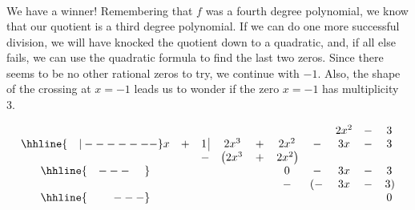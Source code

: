 {\begin{enumerate}
{\[\begin{array}{ccccccccccccc}
 \end{array}\]
 
\setlength\arraycolsep{5pt}
\setlength\extrarowheight{0pt}

}
We have a winner!  Remembering that $f$ was a fourth degree polynomial, we know that our quotient is a third degree polynomial.  If we can do one more successful division, we will have knocked the quotient down to a quadratic, and, if all else fails, we can use the quadratic formula to find the last two zeros.  Since there seems to be no other rational zeros to try, we continue with $-1$.  Also, the shape of the crossing at $x = -1$ leads us to wonder if the zero $x = -1$ has multiplicity 3.

{

\setlength\arraycolsep{0.1pt}
\setlength\extrarowheight{2pt}

\[ \begin{array}{cccccccccc}

& & & & & & & 2x^2 & - & 3 \\ \hhline{~~~|-------}

x & + & 1 \, \vline& 2x^3 & + & 2x^2 & - & 3x & - & 3\\

 &  &  -& \left(2x^3 \right. & + & \left.  2x^2\right) &  &  &  &  \\ \hhline{~~~---~~~~} 
 &  &  &   &   & 0 & - & 3x  & - & 3 \\ 
 &  &  &   &   & - & \left(-\right. & 3x & - & \left.3\right) \\  \hhline{~~~~~~~---} 
 &   &  &  &  &  &  &  &  & 0
 

\end{array}\]}
\end{enumerate}}
